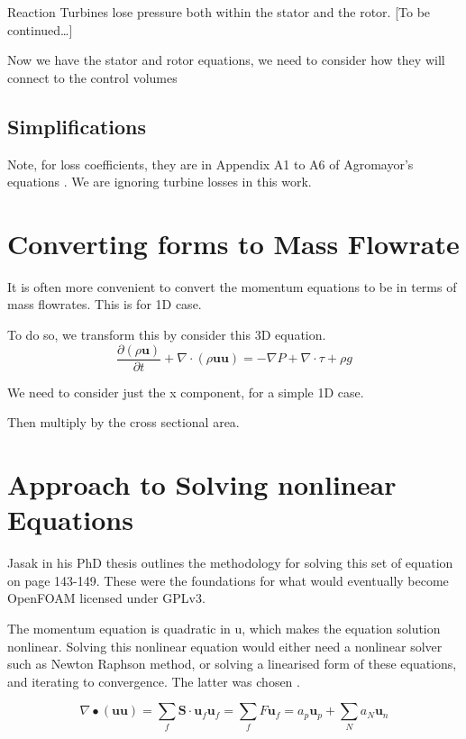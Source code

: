 \documentclass[masters]{ucbthesis}
\renewcommand{\_}{\kern-1.5pt\textunderscore\kern-1.5pt}
\begin{document}
Reaction Turbines lose pressure both within the stator and the rotor.
[To be continued\dots]

Now we have the stator and rotor equations, we need to consider how 
they will connect to the control volumes



\subsection{Simplifications}

Note, for loss coefficients, they are in Appendix A1 to A6 of 
Agromayor's equations \citep{agromayor2019preliminary}.
We are ignoring turbine losses in this work.

\section{Converting forms to Mass Flowrate}

It is often more convenient to convert the momentum equations to be 
in terms of mass flowrates. This is for 1D case.

To do so, we transform this by consider this 3D equation.
\begin{equation}
	\frac{\partial (\rho \textbf{u})}{\partial t} 
	+ \nabla \cdot (\rho \textbf{u} \textbf{u})
	= - \nabla P
	+ \nabla \cdot \tau 
	+ \rho g
\end{equation}

We need to consider just the x component, for a simple 1D case.

Then multiply by the cross sectional area.

\section{Approach to Solving nonlinear Equations}


Jasak in his PhD thesis outlines the methodology for solving this set of 
equation \citep{jasak1996error} on page 143-149. These were the foundations 
for what would eventually become OpenFOAM \cite{jasak2007openfoam} licensed 
under GPLv3.

The momentum equation is quadratic in u, which makes the equation solution 
nonlinear. Solving this nonlinear equation would either need a nonlinear 
solver such as Newton Raphson method, or solving a linearised form of 
these equations, and iterating to convergence. The latter was chosen 
\citep{jasak1996error}.

\begin{equation}
	\nabla \bullet (\mathbf{u u}) 
	= \sum_f \mathbf{S} \cdot \mathbf{u}_f\mathbf{u}_f
	= \sum_f F \mathbf{u}_f
	= a_p \mathbf{u}_p + \sum_N a_N \textbf{u}_n
\end{equation}
\end{document}
